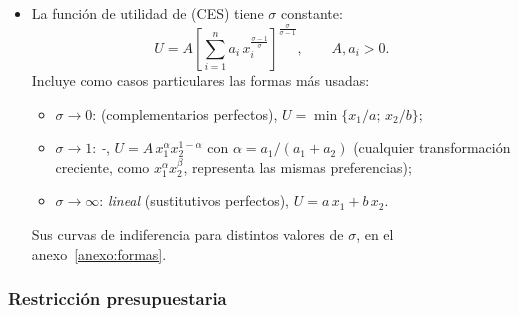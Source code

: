 \documentclass[11pt]{article}
\begin{document}
\begin{itemize}
\begin{itemize}
\begin{itemize}
    \end{itemize}
  \end{itemize}
\item La función de utilidad de  (CES) tiene $\sigma$ constante:
  \begin{equation}
  U=A\left[\sum_{i=1}^{n}a_i\,x_i^{\frac{\sigma-1}{\sigma}}\right]^{\frac{\sigma}{\sigma-1}},\qquad A,a_i>0. \label{eq:ces}
  \end{equation}
  Incluye como casos particulares las formas más usadas\nocite{ArrowEtAl1961Capital}:
  \begin{itemize}
  \item $\sigma\to 0$: \emph{} (complementarios perfectos), $U=\min\{x_1/a;\,x_2/b\}$;
  \item $\sigma\to 1$: \emph{-}, $U=A\,x_1^{\alpha}x_2^{1-\alpha}$ con $\alpha=a_1/(a_1+a_2)$ (cualquier transformación creciente, como $x_1^{\alpha}x_2^{\beta}$, representa las mismas preferencias);
  \item $\sigma\to\infty$: \emph{lineal} (sustitutivos perfectos), $U=a\,x_1+b\,x_2$.
  \end{itemize}
  Sus curvas de indiferencia para distintos valores de $\sigma$, en el anexo~\ref{anexo:formas}.
\end{itemize}

\subsubsection{Restricción presupuestaria}\label{sec:restriccion-presupuestaria}
\end{document}
